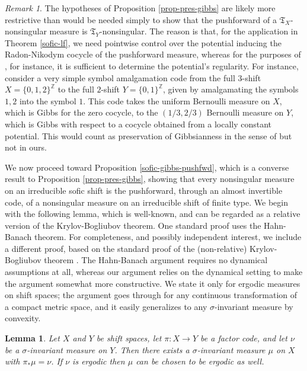 \documentclass{amsproc}
\numberwithin{theorem}{section}
\newtheorem{lemma}[theorem]{Lemma}
\theoremstyle{remark}
\newtheorem*{remark}{Remark}
\theoremstyle{definition}
\newcommand{\fT}{\mathfrak{T}}
\newcommand{\Z}{\mathbb{Z}}
\theoremstyle{plain}
\begin{document}
\begin{remark}
The hypotheses of Proposition \ref{prop-pres-gibbs} are likely more restrictive than would be needed simply to show that the pushforward of a $\fT_X$-nonsingular measure is $\fT_Y$-nonsingular. The reason is that, for the application in Theorem \ref{sofic-lf}, we need pointwise control over the potential inducing the Radon-Nikodym cocycle of the pushforward measure, whereas for the purposes of \cite{pollicott-kempton-2011-factors}, for instance, it is sufficient to determine the potential's regularity. For instance, consider a very simple symbol amalgamation code from the full $3$-shift $X= \{ 0,1,2  \}^{\Z}$ to the full $2$-shift $Y=\{ 0,1 \}^{\Z}$, given by amalgamating the symbols $1,2$ into the symbol $1$. This code takes the uniform Bernoulli measure on $X$, which is Gibbs for the zero cocycle, to the $(1/3,2/3)$ Bernoulli measure on $Y$, which is Gibbs with respect to a cocycle obtained from a locally constant potential. This would count as preservation of Gibbsianness in the sense of \cite{pollicott-kempton-2011-factors} but not in ours.
\end{remark}





We now proceed toward Proposition \ref{sofic-gibbs-pushfwd}, which is a converse result to Proposition \ref{prop-pres-gibbs}, showing that every nonsingular measure on an irreducible sofic shift is the pushforward, through an almost invertible code, of a nonsingular measure on an irreducible shift of finite type. We begin with the following lemma, which is well-known, and can be regarded as a relative version of the Krylov-Bogliubov theorem. One standard proof uses the Hahn-Banach theorem. For completeness, and possibly independent interest, we include a different proof, based on the standard proof of the (non-relative) Krylov-Bogliubov theorem \cite{walters1982ergodic}. The Hahn-Banach argument requires no dynamical assumptions at all, whereas our argument relies on the dynamical setting to make the argument somewhat more constructive. We state it only for ergodic measures on shift spaces; the argument goes through for any continuous transformation of a compact metric space, and it easily generalizes to any $\sigma$-invariant measure by convexity.

\begin{lemma}\label{rel-kry-bog}
Let $X$ and $Y$ be shift spaces, let $\pi: X \to Y$ be a factor code, and let $\nu$ be a $\sigma$-invariant measure on $Y$. Then there exists a $\sigma$-invariant measure $\mu$ on $X$ with $\pi_* \mu = \nu$. If $\nu$ is ergodic then $\mu$ can be chosen to be ergodic as well.
\end{lemma}
\end{document}
